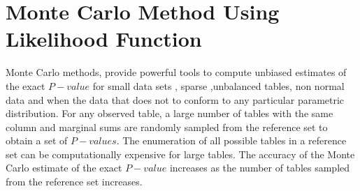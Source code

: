 \documentclass[12pt,oneside]{report}
\theoremstyle{definition}
\theoremstyle{mystyle}
\begin{document}
	



\section{Monte Carlo Method Using Likelihood Function} 
Monte Carlo methods,  provide  powerful tools to compute unbiased estimates of the  exact $P-value$  for small data sets ,  sparse ,unbalanced  tables, non normal  data and when  the data that does not to conform to any particular parametric distribution.
  For any observed table, a large number of   tables with the same column and marginal sums are randomly  sampled from the reference set to obtain a set of $P-values$. The enumeration of all possible tables in a reference set can be computationally expensive for  large tables. The accuracy of the  Monte Carlo estimate of the exact $P-value$  increases as  the number of  tables sampled from the reference set increases.%
\end{document}
